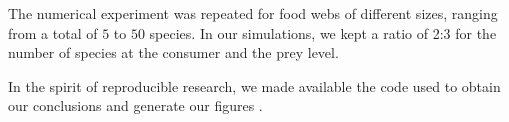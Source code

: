 The numerical experiment was repeated for food webs of different sizes, ranging from a total of $5$ to $50$ species. In our simulations, we kept a ratio of 2:3 for the number of species at the consumer and the prey level.

In the spirit of reproducible research, we made available the code used to obtain our conclusions and generate our figures \citep{Rodriguez-Sanchez-code-neuchaos}.